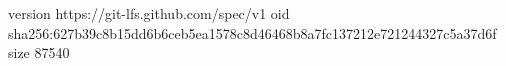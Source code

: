 version https://git-lfs.github.com/spec/v1
oid sha256:627b39c8b15dd6b6ceb5ea1578c8d46468b8a7fc137212e721244327c5a37d6f
size 87540
